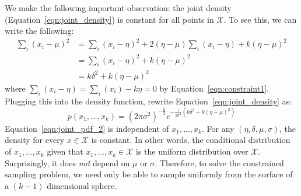 We make the following important observation: the joint density (Equation~\ref{eqn:joint_density}) is constant for all points in $\mathcal{X}$. To see this, we can write the following:
\begin{equation*}
\begin{split}
    \sum_{i}(x_i - \mu)^2 &= \sum_i(x_i - \eta)^2  + 2(\eta - \mu)\sum_i(x_i - \eta) + k(\eta - \mu)^2 \\
    &= \sum_i(x_i - \eta)^2 + k(\eta - \mu)^2 \\
    &= k \delta^2 + k(\eta - \mu)^2
\end{split}
\label{eqn:proof1}
\end{equation*}
where $\sum_i(x_i - \eta) = \sum_i(x_i) - k\eta = 0$ by Equation~\ref{eqn:constraint1}. Plugging this into the density function, rewrite Equation~\ref{eqn:joint_density} as:
\begin{equation}
    p(x_1, ..., x_k) = (2\pi \sigma^2)^{-\frac{k}{2}}e^{-\frac{1}{2\sigma^2}(k \delta^2 + k(\eta - \mu)^2)}
\label{eqn:joint_pdf_2}
\end{equation}
Equation~\ref{eqn:joint_pdf_2} is independent of $x_1, ..., x_k$. For any $(\eta, \delta, \mu, \sigma)$, the density for every $x \in \mathcal{X}$ is constant. In other words, the conditional distribution of $x_1, ..., x_k$ given that $x_1, ..., x_k \in \mathcal{X}$ is the uniform distribution over $\mathcal{X}$. Surprisingly, it does \textit{not} depend on $\mu$ or $\sigma$.
Therefore, to solve the constrained sampling problem, we need only be able to sample uniformly from the surface of a $(k-1)$ dimensional sphere.

